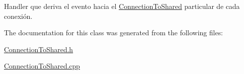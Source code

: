 Handler que deriva el evento hacia el \hyperlink{class_connection_to_shared}{Connection\+To\+Shared} particular de cada conexión. 



The documentation for this class was generated from the following files\+:\begin{DoxyCompactItemize}
\item 
\hyperlink{_connection_to_shared_8h}{Connection\+To\+Shared.\+h}\item 
\hyperlink{_connection_to_shared_8cpp}{Connection\+To\+Shared.\+cpp}\end{DoxyCompactItemize}

